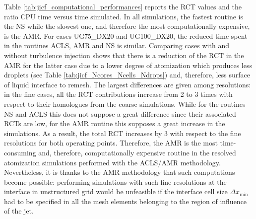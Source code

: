 

Table \ref{tab:jicf_computational_performances} reports the RCT values and the ratio CPU time versus time simulated. In all simulations, the fastest routine is the NS while the slowest one, and therefore the most computationally expensive, is the AMR. For cases UG75\_DX20 and UG100\_DX20, the reduced time spent in the routines ACLS, AMR and NS is similar. Comparing cases with and without turbulence injection shows that there is a reduction of the RCT in the AMR for the latter case due to a lower degree of atomization which produces less droplets (see Table \ref{tab:jicf_Ncores_Ncells_Ndrops}) and, therefore, less surface of liquid interface to remesh. The largest differences are given among resolutions: in the fine cases, all the RCT contributions increase from 2 to 3 times with respect to their homologues from the coarse simulations. While for the routines NS and ACLS this does not suppose a great difference since their associated RCTs are low, for the AMR routine this supposes a great increase in the simulations. As a result, the total RCT increases by 3 with respect to the fine resolutions for both operating points. Therefore, the AMR is the most time-consuming and, therefore, computationally expensive routine in the resolved atomization simulations performed with the ACLS/AMR methodology. Nevertheless, it is thanks to the AMR methodology that such computations become possible: performing simulations with such fine resolutions at the interface in unstructured grid would be unfeasible if the interface cell size $\Delta x_\mathrm{min}$ had to be specified in all the mesh elements belonging to the region of influence of the jet. 


